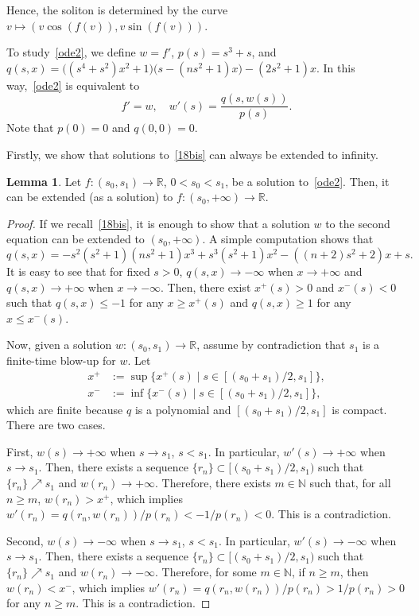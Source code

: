 \documentclass[oneside,12pt]{amsart}
\theoremstyle{definition}
\newtheorem{lemma}{Lemma}
\newcommand{\R}{\mathbb{R}}
\begin{document}
Hence, the soliton is determined by the curve $v \mapsto \left( v \cos\left( f(v) \right), v \sin\left( f(v) \right) \right)$. 

To study~\eqref{ode2}, we define $w=f'$, $p(s)=s^3+s$, and $q(s,x)=\big((s^4+s^2)x^2+1\big)\big(s-(ns^2+1)x\big)-(2s^2+1)x$. In this way,~\eqref{ode2} is equivalent to
\begin{equation}\label{18bis} f'=w, \quad w'(s)=\frac{q(s,w(s))}{p(s)}. 
\end{equation}
Note that $p(0)=0$ and $q(0,0)=0$. 

Firstly, we show that solutions to~\eqref{18bis} can always be extended to infinity. 

\begin{lemma} \label{extendtoinfinity} Let $f\colon(s_0,s_1)\to \R$, $0<s_0<s_1$, be a solution to~\eqref{ode2}. Then, it can be extended (as a solution) to $f\colon (s_0,+\infty) \to \R$.
\end{lemma}
\begin{proof} If we recall~\eqref{18bis}, it is enough to show that a solution $w$ to the second equation can be extended to $(s_0,+\infty)$. A simple computation shows that
\[q(s,x)= -s^2(s^2+1)(ns^2+1)x^3 +s^3(s^2+1)x^2-((n+2)s^2+2)x+s.
\]
It is easy to see that for fixed $s>0$, $q(s,x)\to -\infty$ when $x\to +\infty$ and $q(s,x)\to +\infty$ when $x\to -\infty$. Then, there exist $x^+(s)>0$ and $x^-(s)<0$ such that $q(s,x)\le -1$ for any $x\ge x^+(s)$ and $q(s,x)\ge 1$ for any $x\le x^-(s)$.

Now, given a solution $w:(s_0,s_1)\to\R$, assume by contradiction that $s_1$ is a finite-time blow-up for $w$. Let
\begin{align*}
x^+ &:= \sup\{x^+(s) \mid s\in [(s_0+s_1)/2, s_1]\},\\
x^- &:= \inf\{x^-(s) \mid s\in [(s_0+s_1)/2, s_1]\},
\end{align*}
which are finite because $q$ is a polynomial and $[(s_0+s_1)/2, s_1]$ is compact. There are two cases.

First, $w(s)\to+\infty$ when $s\to s_1$, $s<s_1$. In particular, $w'(s)\to +\infty$ when $s\to s_1$. Then, there exists a sequence $\{r_n\}\subset [(s_0+s_1)/2,s_1)$ such that $\{r_n\}\nearrow s_1$ and $w(r_n)\to+\infty$. Therefore, there exists $m\in\mathbb{N}$ such that, for all $n\ge m$, $w(r_n)> x^+$, which implies $w'(r_n)=q(r_n,w(r_n))/p(r_n)<-1/p(r_n)<0$. This is a contradiction. 

Second, $w(s)\to-\infty$ when $s\to s_1$, $s<s_1$. In particular, $w'(s)\to -\infty$ when $s\to s_1$. 
Then, there exists a sequence $\{r_n\}\subset [(s_0+s_1)/2,s_1)$ such that $\{r_n\}\nearrow s_1$ and $w(r_n)\to-\infty$. Therefore, for some $m\in\mathbb{N}$, if $n\ge m$, then $w(r_n)< x^-$, which implies $w'(r_n)=q(r_n,w(r_n))/p(r_n)>1/p(r_n)>0$ for any $n\ge m$.  This is a contradiction. 
\end{proof}
\end{document}
